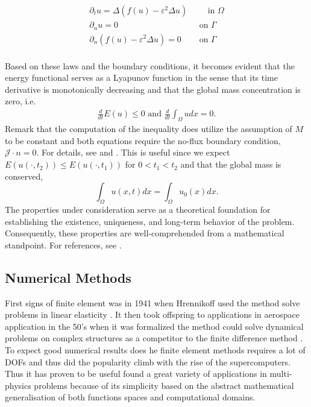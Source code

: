 \begin{equation}
\label{eq:strongch}
    \begin{split}
\partial _{t} u  = \Delta ( f( u)  - \varepsilon ^2 \Delta u ) &\quad \text{ in } \Omega  \\
\partial _{n} u = 0 \quad &\text{ on } \Gamma  \\
\partial _{n}(f( u)  - \varepsilon ^2 \Delta u )  = 0 \quad &\text{ on } \Gamma  \\
    \end{split}
\end{equation}

Based on these laws and the boundary conditions, it becomes evident that the energy functional serves as a Lyapunov function in the sense that its time derivative is monotonically decreasing and that the global mass concentration is zero, i.e.
\[
    \begin{split}
\frac{d}{dt} E( u)  \le  0 \text{ and }\frac{d}{dt} \int_{\Omega }^{}  u dx = 0.
    \end{split}
\]
Remark that the computation of the inequality does utilize the assumption of $M$ to be constant and both equations require the no-flux boundary condition, $\mathcal{J} \cdot n = 0$.
For details, see \cite[Equation 17 ]{lee2014physical} and \cite[Equation 1.7]{garcke2020weak}.
This is useful since we expect $E( u( \cdot , t_{2}) ) \le  E( u( \cdot , t_{1}) ) $ for $0 < t_{1} < t_{2} $ and that the global mass is conserved, \[
\int_{\Omega }^{} u ( x,t)  dx = \int_{\Omega }^{} u_{0}(x)  dx.
\]
The properties under consideration serve as a theoretical foundation for establishing the existence, uniqueness, and long-term behavior of the problem. Consequently, these properties are well-comprehended from a mathematical standpoint. For
references, see \cite{abels2007convergence, cherfils2011cahn,
elliott1986cahn}.

\subsection{Numerical Methods}%
\label{sub:numerical_methods}


First signs of finite element was in 1941 when Hrennikoff used the method solve problems in linear elasticity \cite{hrennikoff1941solution}. It then took offspring to applications in aerospace application in the 50's when it was formalized the method
could solve dynamical problems on complex structures as a competitor to the finite difference method
\cite{argyris1960energy, turner1956stiffness, liu2022eighty}. To expect good numerical results does he finite element methods requires a lot of DOFs and thus did the popularity climb with the rise of the supercomputers. Thus it has proven to be
useful found a great variety of applications in multi-physics problems because of its simplicity based on the abstract mathematical generalisation of both functions spaces and computational domains.

